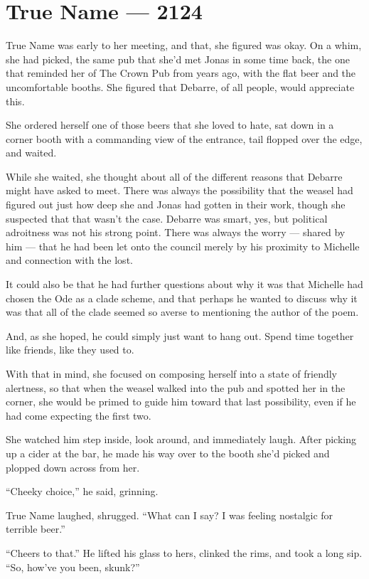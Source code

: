 \hypertarget{true-name-2124}{%
\chapter{True Name — 2124}\label{true-name-2124}}

True Name was early to her meeting, and that, she figured was okay. On a whim, she had picked, the same pub that she'd met Jonas in some time back, the one that reminded her of The Crown Pub from years ago, with the flat beer and the uncomfortable booths. She figured that Debarre, of all people, would appreciate this.

She ordered herself one of those beers that she loved to hate, sat down in a corner booth with a commanding view of the entrance, tail flopped over the edge, and waited.

While she waited, she thought about all of the different reasons that Debarre might have asked to meet. There was always the possibility that the weasel had figured out just how deep she and Jonas had gotten in their work, though she suspected that that wasn't the case. Debarre was smart, yes, but political adroitness was not his strong point. There was always the worry — shared by him — that he had been let onto the council merely by his proximity to Michelle and connection with the lost.

It could also be that he had further questions about why it was that Michelle had chosen the Ode as a clade scheme, and that perhaps he wanted to discuss why it was that all of the clade seemed so averse to mentioning the author of the poem.

And, as she hoped, he could simply just want to hang out. Spend time together like friends, like they used to.

With that in mind, she focused on composing herself into a state of friendly alertness, so that when the weasel walked into the pub and spotted her in the corner, she would be primed to guide him toward that last possibility, even if he had come expecting the first two.

She watched him step inside, look around, and immediately laugh. After picking up a cider at the bar, he made his way over to the booth she'd picked and plopped down across from her.

``Cheeky choice,'' he said, grinning.

True Name laughed, shrugged. ``What can I say? I was feeling nostalgic for terrible beer.''

``Cheers to that.'' He lifted his glass to hers, clinked the rims, and took a long sip. ``So, how've you been, skunk?''

